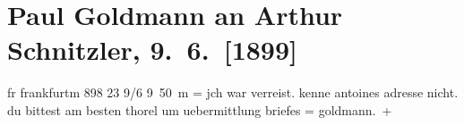 

         
         \renewcommand{\erwaehntePersonen}{Personen: André Antoine, Paul Goldmann, Jean Thorel}
         \renewcommand{\erwaehnteOrte}{Orte: Frankfurt am Main, Wien}
         \renewcommand{\erwaehnteWerke}{}
               \section[Paul Goldmann an Arthur Schnitzler, 9. 6. {[}1899{]}]{ Paul Goldmann an Arthur Schnitzler, 9. 6. {[}1899{]}}\nopagebreak{}\rehead{ }\begin{ledgroupsized}[t]{13cm}\normalsize\beginnumbering \toendnotes[C]{\smallbreak\pagebreak[2]} 
\pstart
           \noindent{}\centering{}{\pb}fr frankfurtm 898
               23 9/6{ }9 50 m =\pend
           \pstart
           \noindent{}jch war verreist. kenne antoines adresse nicht.
               du bittest am besten thorel um uebermittlung
               briefes = \spacefill\mbox{goldmann. +}\pend
           
         
         \endnumbering{}\end{ledgroupsized}  \newcommand{\dateiname}{L02681}\newcommand{\titel}{Paul Goldmann an Arthur Schnitzler, 9. 6. [1899]}\newcommand{\editorInnen}{Martin Anton Müller und Laura Untner}
      